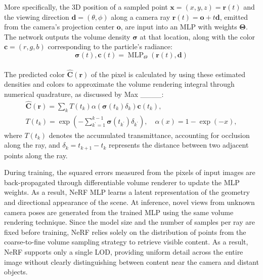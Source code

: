 More specifically, the 3D position of a sampled point $\textbf{x} = (x,y,z) = \textbf{r}(t)$ and the viewing direction $\textbf{d} = (\theta,\phi)$ along a camera ray $\textbf{r}(t) = \textbf{o} + t\textbf{d}$, emitted from the camera's projection center $\textbf{o}$, are input into an MLP with weights $\boldsymbol\Theta$. The network outputs the volume density $\boldsymbol\sigma$ at that location, along with the color $\textbf{c} = (r, g, b)$ corresponding to the particle's radiance:
$$
\boldsymbol\sigma(t), \textbf{c}(t)=\operatorname{MLP}_{\Theta}(\textbf{r}(t), \textbf{d})
$$
\\
The predicted color $\hat{\mathbf{C}}(\mathbf{r})$ of the pixel is calculated by using these estimated densities and colors to approximate the volume rendering integral through numerical quadrature, as discussed by Max ____:
$$
\begin{gathered}
\hat{\mathbf{C}}(\mathbf{r})=\sum_k T\left(t_k\right) \alpha\left(\boldsymbol\sigma\left(t_k\right) \delta_k\right) \textbf{c}\left(t_k\right), \\
T\left(t_k\right)=\exp \left(-\sum_{k^{\prime}=1}^{k-1} \boldsymbol\sigma\left(t_{k^{\prime}}\right) \delta_{k^{\prime}}\right), \quad \alpha(x)=1-\exp (-x),
\end{gathered}
$$
where $T\left(t_k\right)$ denotes the accumulated transmittance, accounting for occlusion along the ray, and $ \delta_k = t_{k+1} - t_k $ represents the distance between two adjacent points along the ray.

During training, the squared errors measured from the pixels of input images are back-propagated through differentiable volume renderer to update the MLP weights. 
As a result, NeRF MLP learns a latent representation of the geometry and directional appearance of the scene. 
At inference, novel views from unknown camera poses are generated from the trained MLP using the same volume rendering technique.
Since the model size and the number of samples per ray are fixed before training, NeRF relies solely on the distribution of points from the coarse-to-fine volume sampling strategy to retrieve visible content.
As a result, NeRF supports only a single LOD, providing uniform detail across the entire image without clearly distinguishing between content near the camera and distant objects.


